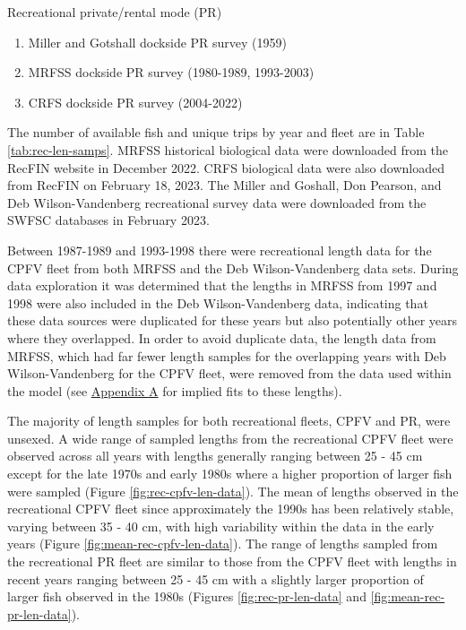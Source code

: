 \documentclass[11pt,
  letterpaper,
]{article}
\begin{document}
Recreational private/rental mode (PR)

\begin{enumerate}
  \item Miller and Gotshall dockside PR survey (1959)
  \item MRFSS dockside PR survey (1980-1989, 1993-2003)
  \item CRFS dockside PR survey (2004-2022)
\end{enumerate}

The number of available fish and unique trips by year and fleet are in Table \ref{tab:rec-len-samps}. MRFSS historical biological data were downloaded from the RecFIN website in December 2022. CRFS biological data were also downloaded from RecFIN on February 18, 2023. The Miller and Goshall, Don Pearson, and Deb Wilson-Vandenberg recreational survey data were downloaded from the SWFSC databases in February 2023.

Between 1987-1989 and 1993-1998 there were recreational length data for the CPFV fleet from both MRFSS and the Deb Wilson-Vandenberg data sets. During data exploration it was determined that the lengths in MRFSS from 1997 and 1998 were also included in the Deb Wilson-Vandenberg data, indicating that these data sources were duplicated for these years but also potentially other years where they overlapped. In order to avoid duplicate data, the length data from MRFSS, which had far fewer length samples for the overlapping years with Deb Wilson-Vandenberg for the CPFV fleet, were removed from the data used within the model (see \hyperref[excluded-data]{Appendix A} for implied fits to these lengths).

The majority of length samples for both recreational fleets, CPFV and PR, were unsexed. A wide range of sampled lengths from the recreational CPFV fleet were observed across all years with lengths generally ranging between 25 - 45 cm except for the late 1970s and early 1980s where a higher proportion of larger fish were sampled (Figure \ref{fig:rec-cpfv-len-data}). The mean of lengths observed in the recreational CPFV fleet since approximately the 1990s has been relatively stable, varying between 35 - 40 cm, with high variability within the data in the early years (Figure \ref{fig:mean-rec-cpfv-len-data}). The range of lengths sampled from the recreational PR fleet are similar to those from the CPFV fleet with lengths in recent years ranging between 25 - 45 cm with a slightly larger proportion of larger fish observed in the 1980s (Figures \ref{fig:rec-pr-len-data} and \ref{fig:mean-rec-pr-len-data}).
\end{document}
